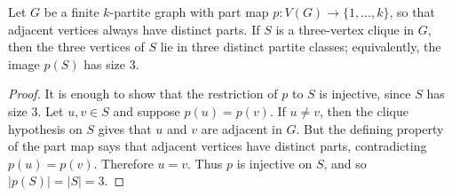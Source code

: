 \begin{helper}
Let $G$ be a finite $k$-partite graph with part map
$p:V(G)\to\{1,\ldots,k\}$, so that adjacent vertices always have distinct
parts.  If $S$ is a three-vertex clique in $G$, then the three vertices of
$S$ lie in three distinct partite classes; equivalently, the image $p(S)$
has size $3$.
\end{helper}
\begin{proof}
It is enough to show that the restriction of $p$ to $S$ is injective, since
$S$ has size $3$.  Let $u,v\in S$ and suppose $p(u)=p(v)$.  If $u\ne v$,
then the clique hypothesis on $S$ gives that $u$ and $v$ are adjacent in
$G$.  But the defining property of the part map says that adjacent vertices
have distinct parts, contradicting $p(u)=p(v)$.  Therefore $u=v$.
Thus $p$ is injective on $S$, and so $|p(S)|=|S|=3$.
\end{proof}
